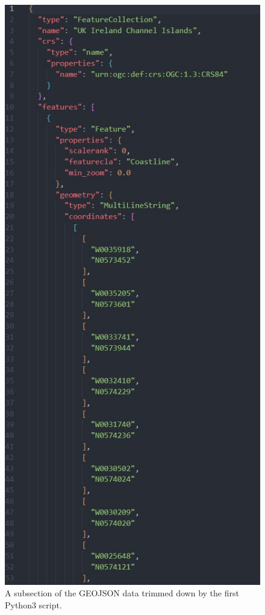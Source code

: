 \documentclass[stu, a4paper, 12pt, floatsintext]{apa7}
\numberwithin{figure}{section}
\numberwithin{table}{section}
\numberwithin{equation}{section}
\begin{document}
\begin{figure}[H]
    \caption{A subsection of the GEOJSON data trimmed down by the first Python3 script.}
    \label{fig:2.5}
    \centering
    \includegraphics[width=1.1\textwidth]{pictures/Figure 2.5 FYP.jpg}    
\end{figure}
\end{document}
